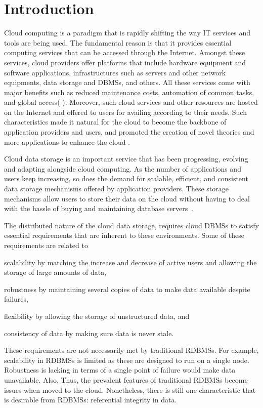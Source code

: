 \chapter{Introduction}

% 
  
Cloud computing is a paradigm that is rapidly shifting the way IT services
and tools are being used. The fundamental reason is that it provides
 essential computing services that can be accessed through the Internet. 
 Amongst these services, cloud providers offer platforms that
 include hardware equipment and software applications, infrastructures such as
 servers and other network equipments, data storage and \acp{DBMS}, and
 others. All these services come with major benefits such as reduced maintenance
 costs,  automation of common tasks, and global access( ). Moreover, such cloud
 services and other resources are hosted on the Internet and offered to  
 users for availing according to their needs.  Such characteristics made it
  natural for the  cloud to become  the backbone of application providers and
  users, and promoted the creation of novel theories and more applications to
 enhance the cloud .
 
  
  Cloud data storage is an important service that has been progressing, evolving
  and adapting alongside cloud computing. As the number of
  applications and users keep increasing, so does the demand for scalable, 
  efficient, and consistent data storage mechanisms offered by
  application providers. These storage mechanisms allow  users to store
  their data on the cloud without having to deal with the hassle of buying and
  maintaining database servers~\citep{SNIA}.

 The distributed nature of the cloud data storage, requires
 cloud \acp{DBMS} to satisfy essential requirements that are inherent to these
 environments. Some of these requirements are related to
  \begin{inparaenum}[a)]
 \item  scalability by matching the increase and decrease of active users
 and allowing the storage of large amounts of data,
 \item  robustness by maintaining several copies of data to make data
 available despite failures,
 \item  flexibility by allowing the storage of unstructured data, and
 \item  consistency of data by making sure data is never stale.
 \end{inparaenum}
   These requirements are not necessarily met by traditional \acp{RDBMS}. For
   example, scalability in \acp{RDBMS} is limited as these are designed to run
   on a single node. Robustness is lacking in terms of  a single point of
   failure would  make data unavailable. Also,     Thus, the  prevalent
   features of traditional \acp{RDBMS}  become issues when moved to the cloud.
    Nonetheless, there is still one characteristic that is desirable from
   \acp{RDBMS}: referential integrity in data.
   
